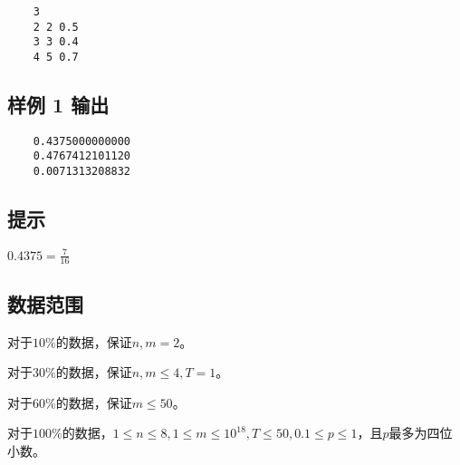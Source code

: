 \documentclass[12pt]{article}
\begin{document}
\begin{lstlisting}
    3
    2 2 0.5
    3 3 0.4
    4 5 0.7
\end{lstlisting}

\subsection{样例 1 输出}

\begin{lstlisting}
    0.4375000000000
    0.4767412101120
    0.0071313208832
\end{lstlisting}

\subsection{提示}

$0.4375 = \frac{7}{16}$

\subsection{数据范围}

对于$10\%$的数据，保证$n, m = 2$。\par
对于$30\%$的数据，保证$n, m \leq 4, T = 1$。\par
对于$60\%$的数据，保证$m \leq 50$。\par
对于$100\%$的数据，$1\leq n\leq 8, 1\leq m \leq 10^{18}, T\leq 50, 0.1\leq p\leq 1$，且$p$最多为四位小数。\par
\end{document}

